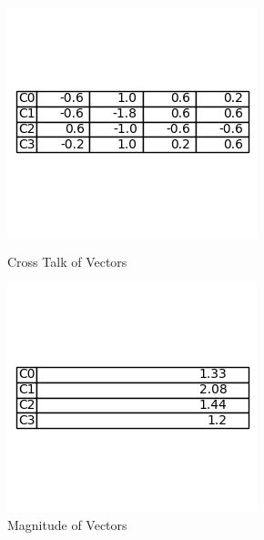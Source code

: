 \documentclass[12pt]{article}
\begin{document}
\begin{figure}[ht]
    \centering
    \begin{minipage}{0.45\textwidth}
        \centering
        \includegraphics[width=\linewidth]{CrossTalk2.png}
        \vspace{-2cm}
        \caption{Cross Talk of Vectors}
        \label{fig:crosstalk}
    \end{minipage}\hfill
    \begin{minipage}{0.45\textwidth}
        \centering
        \includegraphics[width=\linewidth]{magnitude2.png}
        \vspace{-2cm}
        \caption{Magnitude of Vectors}
        \label{fig:magnitude}
    \end{minipage}
\end{figure}
\end{document}

